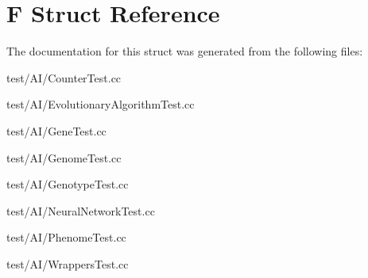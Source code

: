 \hypertarget{structF}{}\section{F Struct Reference}
\label{structF}


The documentation for this struct was generated from the following files\+:\begin{DoxyCompactItemize}
\item 
test/\+A\+I/Counter\+Test.\+cc\item 
test/\+A\+I/Evolutionary\+Algorithm\+Test.\+cc\item 
test/\+A\+I/Gene\+Test.\+cc\item 
test/\+A\+I/Genome\+Test.\+cc\item 
test/\+A\+I/Genotype\+Test.\+cc\item 
test/\+A\+I/Neural\+Network\+Test.\+cc\item 
test/\+A\+I/Phenome\+Test.\+cc\item 
test/\+A\+I/Wrappers\+Test.\+cc\end{DoxyCompactItemize}
